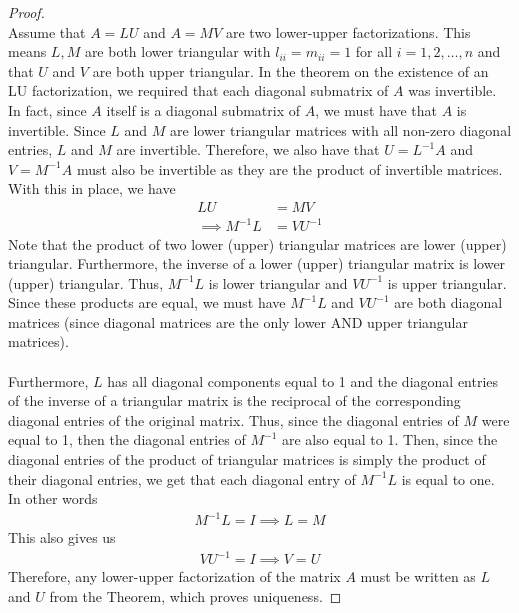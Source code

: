 \documentclass[10pt,a4paper]{article}
\theoremstyle{definition}
\theoremstyle{definition}
\numberwithin{equation}{section}
\begin{document}
\begin{proof}$ $
\\Assume that $A = LU$ and $A = MV$ are two lower-upper factorizations. This means $L, M$ are both lower triangular with $l_{ii} = m_{ii} = 1$ for all $i = 1, 2, \ldots, n$ and that $U$ and $V$ are both upper triangular. In the theorem on the existence of an LU factorization, we required that each diagonal submatrix of $A$ was invertible. In fact, since $A$ itself is a diagonal submatrix of $A$, we must have that $A$ is invertible. Since $L$ and $M$ are lower triangular matrices with all non-zero diagonal entries, $L$ and $M$ are invertible. Therefore, we also have that $U = L^{-1}A$ and $V = M^{-1}A$ must also be invertible as they are the product of invertible matrices. With this in place, we have
\begin{align*}
LU &= MV\\
\implies M^{-1}L &= V U^{-1}
\end{align*}
Note that the product of two lower (upper) triangular matrices are lower (upper) triangular. Furthermore, the inverse of a lower (upper) triangular matrix is lower (upper) triangular. Thus, $M^{-1}L$ is lower triangular and $VU^{-1}$ is upper triangular. Since these products are equal, we must have $M^{-1}L$ and $VU^{-1}$ are both diagonal matrices (since diagonal matrices are the only lower AND upper triangular matrices). 
\\
\\Furthermore, $L$ has all diagonal components equal to 1 and the diagonal entries of the inverse of a triangular matrix is the reciprocal of the corresponding diagonal entries of the original matrix. Thus, since the diagonal entries of $M$ were equal to 1, then the diagonal entries of $M^{-1}$ are also equal to 1. Then, since the diagonal entries of the product of triangular matrices is simply the product of their diagonal entries, we get that each diagonal entry of $M^{-1}L$ is equal to one. In other words
\begin{align*}
M^{-1}L = I \implies L = M
\end{align*}
This also gives us
\begin{align*}
VU^{-1} = I \implies V = U
\end{align*}
Therefore, any lower-upper factorization of the matrix $A$ must be written as $L$ and $U$ from the Theorem, which proves uniqueness. 
\end{proof}
\end{document}
